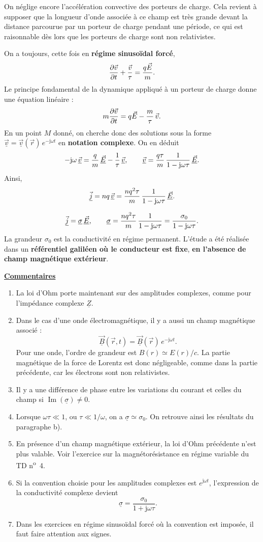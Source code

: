 \documentclass[11pt,a4paper]{article}
\newif\ifinexample
\newcommand{\vv}{\vec v}
\newcommand{\titr}[1]{\par\ifinexample\else\Needspace{4\baselineskip}\fi\textbf{\underline{#1}}\par\nopagebreak[3]}
\newcommand{\vj}{\vec j}\newcommand{\vE}{\vec E}\newcommand{\vB}{\vec B}
\newcommand{\cx}[1]{\underline{#1}}
\newcommand{\imag}{\mathrm{j}}
\newcommand{\partim}{\operatorname{Im}}
\begin{document}
On néglige encore l'accélération convective des porteurs de charge. Cela revient à supposer que
la longueur d'onde associée à ce champ est très grande devant la distance parcourue par un
porteur de charge pendant une période, ce qui est raisonnable dès lors que les porteurs de charge
sont non relativistes.

On a toujours, cette fois en \textbf{régime sinusoïdal forcé},
\[
 \frac{\partial\vv}{\partial t}+\frac{\vv}{\tau}=\frac{q\E}{m}.
\]
Le principe fondamental de la dynamique appliqué à un porteur de charge donne une équation linéaire :
\[
 m\frac{\partial\vv}{\partial t}=q\E-\frac m\tau\,\vv.
\]
En un point \(M\) donné, on cherche donc des solutions sous la forme
\(\cx{\vv}=\cx{\vv}(\vec r)\,e^{-\imag\omega t}\) en \textbf{notation complexe}.
On en déduit
\[
 -\imag\omega\,\cx{\vv}=\frac qm\,\cx{\E}-\frac1\tau\,\cx{\vv},
 \qquad
 \cx{\vv}=\frac{q\tau}{m}\,\frac{1}{1-\imag\omega\tau}\,\cx{\E}.
\]
Ainsi,
\[
 \cx{\vj}=nq\,\cx{\vv}
   =\frac{nq^2\tau}{m}\,\frac{1}{1-\imag\omega\tau}\,\cx{\E}.
\]
\begin{cadre}
\[
 \cx{\vj}=\cx{\sigma}\,\cx{\E},\qquad
 \cx{\sigma}=\frac{nq^2\tau}{m}\,\frac{1}{1-\imag\omega\tau}
            =\frac{\sigma_0}{1-\imag\omega\tau}.
\]
La grandeur \(\sigma_0\) est la conductivité en régime permanent. L'étude a été réalisée dans un
\textbf{référentiel galiléen où le conducteur est fixe}, \textbf{en l'absence de champ magnétique
extérieur}.
\end{cadre}

\titr{Commentaires}
\begin{enumerate}[label=\arabic*)]
\item La loi d'Ohm porte maintenant sur des amplitudes complexes, comme pour l'impédance complexe \(\cx Z\).
\item Dans le cas d'une onde électromagnétique, il y a aussi un champ magnétique associé :
\[
 \cx{\vB}(\vec r,t)=\cx{\vB}(\vec r)\,e^{-\imag\omega t}.
\]
Pour une onde, l'ordre de grandeur est \(B(r)\simeq E(r)/c\). La partie magnétique de la force de
Lorentz est donc négligeable, comme dans la partie précédente, car les électrons sont non relativistes.
\item Il y a une différence de phase entre les variations du courant et celles du champ
si \(\partim(\cx{\sigma})\ne0\).
\item Lorsque \(\omega\tau\ll1\), ou \(\tau\ll1/\omega\), on a \(\cx{\sigma}\simeq\sigma_0\).
On retrouve ainsi les résultats du paragraphe b).
\item En présence d'un champ magnétique extérieur, la loi d'Ohm précédente n'est plus valable.
Voir l'exercice sur la magnétorésistance en régime variable du TD n\textsuperscript{o}~4.
\item Si la convention choisie pour les amplitudes complexes est \(e^{\imag\omega t}\),
l'expression de la conductivité complexe devient
\[
 \cx{\sigma}=\frac{\sigma_0}{1+\imag\omega\tau}.
\]
\item Dans les exercices en régime sinusoïdal forcé où la convention est imposée,
il faut faire attention aux signes.
\end{enumerate}
\end{document}
